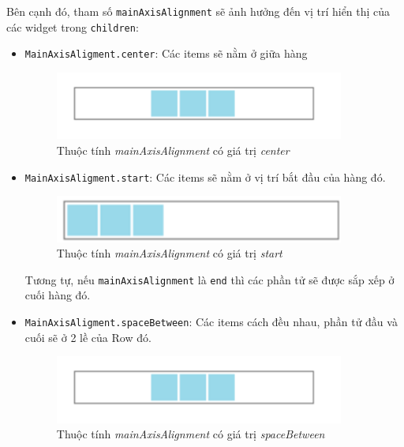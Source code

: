 \documentclass[../DoAn.tex]{subfiles}
\numberwithin{figure}{chapter}
\begin{document}
\begin{itemize}
Bên cạnh đó, tham số \texttt{mainAxisAlignment} sẽ ảnh hưởng đến vị trí hiển thị của các widget trong \texttt{children}:
\begin{itemize}
\item \texttt{MainAxisAligment.center}: Các items sẽ nằm ở giữa hàng
\begin{figure}[H]
    \centering
    \includegraphics[width=0.9\textwidth]{Hinhve/Chuong5/mainAxAlcenter.png}
    \caption{Thuộc tính \textit{mainAxisAlignment} có giá trị \textit{center}}
    \label{fig:rowwidget(center)}
\end{figure}
\item \texttt{MainAxisAligment.start}: Các items sẽ nằm ở vị trí bắt đầu của hàng đó.
\begin{figure}[H]
    \centering
    \includegraphics[width=0.9\textwidth]{Hinhve/Chuong5/mainAxAlstart.png}
    \caption{Thuộc tính \textit{mainAxisAlignment} có giá trị \textit{start}}
    \label{fig:rowwidget(start)}
\end{figure}

Tương tự, nếu \texttt{mainAxisAlignment} là \texttt{end} thì các phần tử sẽ được sắp xếp ở cuối hàng đó.
\item \texttt{MainAxisAligment.spaceBetween}: Các items cách đều nhau, phần tử đầu và cuối sẽ ở 2 lề của Row đó.
\begin{figure}[H]
    \centering
    \includegraphics[width=0.9\textwidth]{Hinhve/Chuong5/mainAxAlspace.png}
    \caption{Thuộc tính \textit{mainAxisAlignment} có giá trị \textit{spaceBetween}}
    \label{fig:rowwidget(end)}
\end{figure}
\end{itemize}


\end{itemize}
\end{document}
